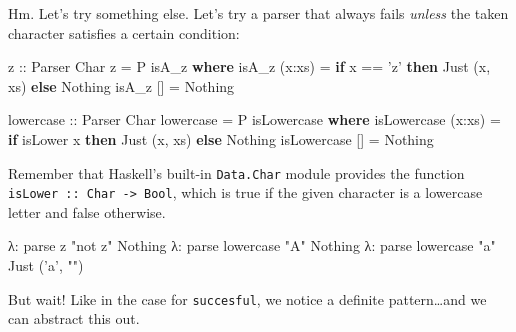\documentclass[]{article}
\newenvironment{Shaded}{}{}
\newcommand{\KeywordTok}[1]{\textcolor[rgb]{0.00,0.44,0.13}{\textbf{{#1}}}}
\newcommand{\DataTypeTok}[1]{\textcolor[rgb]{0.56,0.13,0.00}{{#1}}}
\newcommand{\CharTok}[1]{\textcolor[rgb]{0.25,0.44,0.63}{{#1}}}
\newcommand{\StringTok}[1]{\textcolor[rgb]{0.25,0.44,0.63}{{#1}}}
\newcommand{\OtherTok}[1]{\textcolor[rgb]{0.00,0.44,0.13}{{#1}}}
\newcommand{\FunctionTok}[1]{\textcolor[rgb]{0.02,0.16,0.49}{{#1}}}
\newcommand{\NormalTok}[1]{{#1}}
\begin{document}
Hm. Let's try something else. Let's try a parser that always fails
\emph{unless} the taken character satisfies a certain condition:

\begin{Shaded}
\begin{Highlighting}[]
\OtherTok{z ::} \DataTypeTok{Parser} \DataTypeTok{Char}
\NormalTok{z }\FunctionTok{=} \DataTypeTok{P} \NormalTok{isA_z}
    \KeywordTok{where}
        \NormalTok{isA_z (x}\FunctionTok{:}\NormalTok{xs) }\FunctionTok{=}  \KeywordTok{if} \NormalTok{x }\FunctionTok{==} \CharTok{'z'}
                            \KeywordTok{then} \DataTypeTok{Just} \NormalTok{(x, xs)}
                            \KeywordTok{else} \DataTypeTok{Nothing}
        \NormalTok{isA_z []     }\FunctionTok{=}  \DataTypeTok{Nothing}

\OtherTok{lowercase ::} \DataTypeTok{Parser} \DataTypeTok{Char}
\NormalTok{lowercase }\FunctionTok{=} \DataTypeTok{P} \NormalTok{isLowercase}
    \KeywordTok{where}
        \NormalTok{isLowercase (x}\FunctionTok{:}\NormalTok{xs)  }\FunctionTok{=}   \KeywordTok{if} \NormalTok{isLower x}
                                    \KeywordTok{then} \DataTypeTok{Just} \NormalTok{(x, xs)}
                                    \KeywordTok{else} \DataTypeTok{Nothing}
        \NormalTok{isLowercase []      }\FunctionTok{=}   \DataTypeTok{Nothing}
\end{Highlighting}
\end{Shaded}

Remember that Haskell's built-in \texttt{Data.Char} module provides the
function \texttt{isLower\ ::\ Char\ -\textgreater{}\ Bool}, which is
true if the given character is a lowercase letter and false otherwise.

\begin{Shaded}
\begin{Highlighting}[]
\NormalTok{λ}\FunctionTok{:} \NormalTok{parse z }\StringTok{"not z"}
\DataTypeTok{Nothing}
\NormalTok{λ}\FunctionTok{:} \NormalTok{parse lowercase }\StringTok{"A"}
\DataTypeTok{Nothing}
\NormalTok{λ}\FunctionTok{:} \NormalTok{parse lowercase }\StringTok{"a"}
\DataTypeTok{Just} \NormalTok{(}\CharTok{'a'}\NormalTok{, }\StringTok{""}\NormalTok{)}
\end{Highlighting}
\end{Shaded}

But wait! Like in the case for \texttt{succesful}, we notice a definite
pattern\ldots{}and we can abstract this out.
\end{document}
